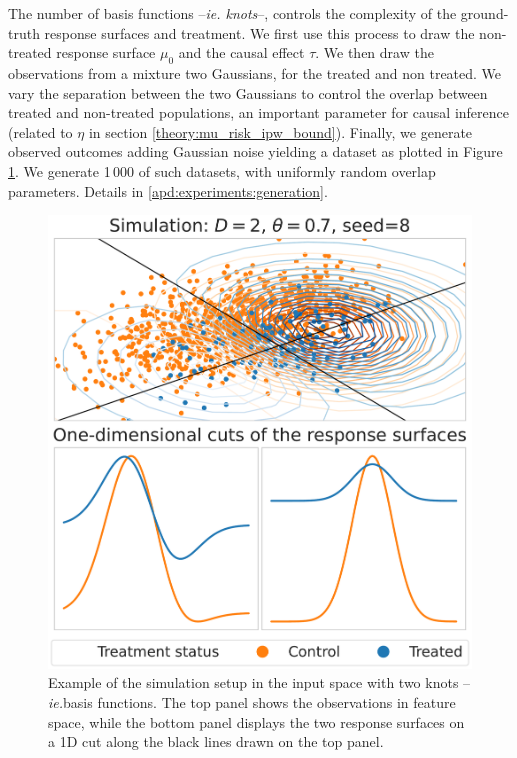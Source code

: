 \documentclass{report}
\begin{document}
The number of basis functions --\emph{ie. knots}--, controls the complexity of
the ground-truth response surfaces and treatment. We first use this process to
draw the non-treated response surface $\mu_0$ and the causal effect $\tau$. We
then draw the observations from a mixture two Gaussians, for the treated and non
treated. We vary the separation between the two Gaussians to control the
overlap between treated and non-treated populations, an important parameter
for causal inference (related to $\eta$ in section
\ref{theory:mu_risk_ipw_bound}). Finally, we generate observed outcomes
adding Gaussian noise yielding a dataset as plotted in Figure \ref{fig:simulation_examples}. We generate 1\,000 of such datasets, with
uniformly random overlap parameters. Details in
\ref{apd:experiments:generation}.

%

\begin{figure}[b!]
  \begin{minipage}{0.3\textwidth}
    \caption{Example of the simulation setup in the input space with two
      knots --\emph{ie.}basis functions. The top panel
      shows the observations in feature space, while the bottom panel displays the
      two response surfaces on a 1D cut along the black lines drawn on
      the top panel.}
    \label{fig:simulation_examples}
  \end{minipage}
  \hfill
  \begin{minipage}{0.65\textwidth}
    \centering
    \includegraphics[width=0.6\linewidth]{img/chapter_5/caussim_example_rs_gaussian=8_rs_rotation=8_ntv=0.37_D=2_overlap=0.7_p_A=0.1.pdf}
  \end{minipage}
\end{figure}
\end{document}
